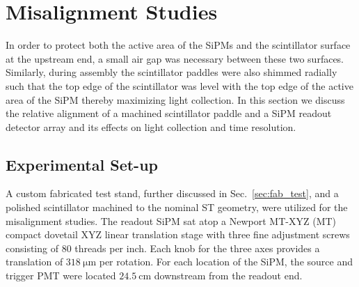 \section{Misalignment Studies} \label{sec:misalign}

In order to protect both the active area of the SiPMs and the scintillator surface at the upstream end, a small air gap was necessary between these two surfaces.  Similarly, during assembly the scintillator paddles were also shimmed radially such that the top edge of the scintillator was level with the top edge of the active area of the SiPM thereby maximizing light collection.  In this section we discuss the relative alignment of a machined scintillator paddle and a SiPM readout detector array and its effects on light collection and time resolution.

\subsection{Experimental Set-up} \label{sec:misalign_setup}

A custom fabricated test stand, further discussed in Sec.~\ref{sec:fab_test}, and a polished scintillator machined to the nominal ST geometry, were utilized for the misalignment studies.  The readout SiPM sat atop a Newport MT-XYZ (MT) compact dovetail XYZ linear translation stage\cite{newport_mt_xyz} with three fine adjustment screws consisting of 80 threads per inch.  Each knob for the three axes provides a translation of $318\ \mathrm{\mu m}$ per rotation.  For each location of the SiPM, the source and trigger PMT were located $\mathrm{24.5~cm}$ downstream from the readout end. 


